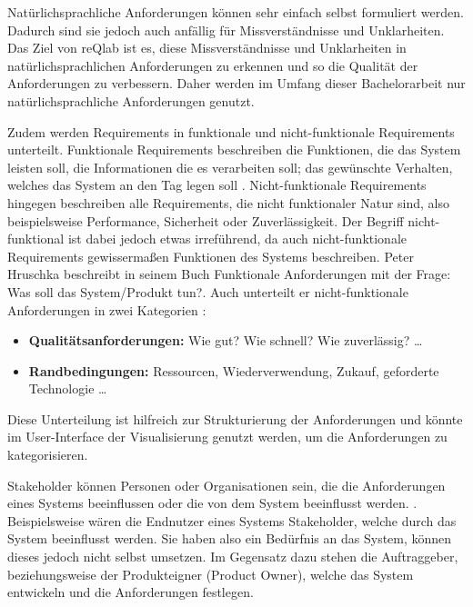     
    Natürlichsprachliche Anforderungen können sehr einfach selbst formuliert werden.
    Dadurch sind sie jedoch auch anfällig für Missverständnisse und Unklarheiten.
    Das Ziel von reQlab ist es, diese Missverständnisse und Unklarheiten in natürlichsprachlichen Anforderungen zu erkennen und so die Qualität der Anforderungen zu verbessern.
    Daher werden im Umfang dieser Bachelorarbeit nur natürlichsprachliche Anforderungen genutzt.

    Zudem werden Requirements in funktionale und nicht-funktionale Requirements unterteilt.
    Funktionale Requirements beschreiben \glqq{}die Funktionen, die das System leisten soll, die Informationen die es verarbeiten soll; das gewünschte Verhalten, welches das System an den Tag legen soll\grqq{} \autocite[][S. 12]{Hruschka2023}.
    Nicht-funktionale Requirements hingegen beschreiben alle Requirements, die nicht funktionaler Natur sind, also beispielsweise Performance, Sicherheit oder Zuverlässigkeit.
    Der Begriff nicht-funktional ist dabei jedoch etwas irreführend, da auch nicht-funktionale Requirements gewissermaßen Funktionen des Systems beschreiben.
    Peter Hruschka beschreibt in seinem Buch Funktionale Anforderungen mit der Frage: \glqq{}Was soll das System/Produkt tun?\grqq{}.
    Auch unterteilt er nicht-funktionale Anforderungen in zwei Kategorien \autocite[][S. 13]{Hruschka2023}:
    \begin{itemize}
      \item \textbf{Qualitätsanforderungen:} \glqq{}Wie gut? Wie schnell? Wie zuverlässig? \ldots\grqq{}
      \item \textbf{Randbedingungen:} \glqq{}Ressourcen, Wiederverwendung, Zukauf, geforderte Technologie \ldots\grqq{}
    \end{itemize}
    
    Diese Unterteilung ist hilfreich zur Strukturierung der Anforderungen und könnte im User-Interface der Visualisierung genutzt werden, um die Anforderungen zu kategorisieren.
    

    Stakeholder können \glqq{}Personen oder Organisationen sein, die die Anforderungen eines Systems beeinflussen oder die von dem System beeinflusst werden.\grqq{} \autocite[][]{ireb_cpre_glossary}.
    Beispielsweise wären die Endnutzer eines Systems Stakeholder, welche durch das System beeinflusst werden.
    Sie haben also ein Bedürfnis an das System, können dieses jedoch nicht selbst umsetzen.
    Im Gegensatz dazu stehen die Auftraggeber, beziehungsweise der Produkteigner (Product Owner), welche das System entwickeln und die Anforderungen festlegen.

